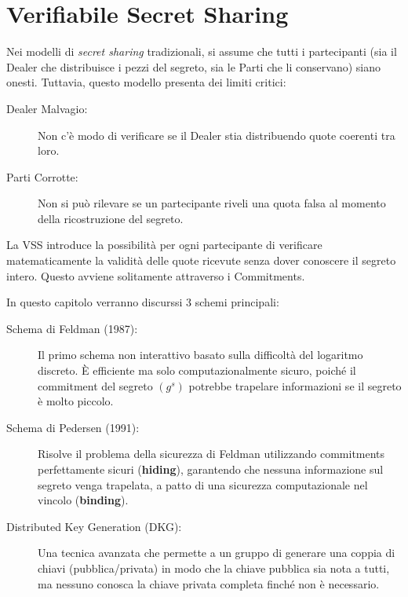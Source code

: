 \documentclass[a4paper, 11pt]{article}
\begin{document}
\newpage

\section{Verifiabile Secret Sharing}

Nei modelli di \textit{secret sharing} tradizionali, si assume che tutti i partecipanti (sia il Dealer che distribuisce i pezzi del segreto, sia le Parti che li conservano) siano onesti. Tuttavia, questo modello presenta dei limiti critici:
\begin{description}
    \item[Dealer Malvagio:] Non c'è modo di verificare se il Dealer stia distribuendo quote coerenti tra loro.
    \item[Parti Corrotte:] Non si può rilevare se un partecipante riveli una quota falsa al momento della ricostruzione del segreto.
\end{description}

La VSS introduce la possibilità per ogni partecipante di verificare matematicamente la validità delle quote ricevute senza dover conoscere il segreto intero. Questo avviene solitamente attraverso i Commitments.

In questo capitolo verranno discurssi 3 schemi principali:

\begin{description}
    \item[Schema di Feldman (1987):] Il primo schema non interattivo basato sulla difficoltà del logaritmo discreto. È efficiente ma solo computazionalmente sicuro, poiché il commitment del segreto $(g^s)$ potrebbe trapelare informazioni se il segreto è molto piccolo.

    \item[Schema di Pedersen (1991):] Risolve il problema della sicurezza di Feldman utilizzando commitments perfettamente sicuri (\textbf{hiding}), garantendo che nessuna informazione sul segreto venga trapelata, a patto di una sicurezza computazionale nel vincolo (\textbf{binding}).

    \item[Distributed Key Generation (DKG):] Una tecnica avanzata che permette a un gruppo di generare una coppia di chiavi (pubblica/privata) in modo che la chiave pubblica sia nota a tutti, ma nessuno conosca la chiave privata completa finché non è necessario.
\end{description}
\end{document}

